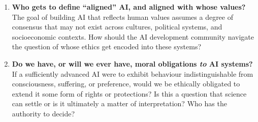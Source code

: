 \documentclass[a4paper,12pt]{article}
\begin{document}
\begin{enumerate}
\item \textbf{Who gets to define ``aligned'' AI, and aligned with
    whose values?} The goal of building AI that reflects human values
  assumes a degree of consensus that may not exist across cultures,
  political systems, and socioeconomic contexts. How should the AI
  development community navigate the question of whose ethics get
  encoded into these systems?

\item \textbf{Do we have, or will we ever have, moral obligations
    \textit{to} AI systems?} If a sufficiently advanced AI were to
  exhibit behaviour indistinguishable from consciousness, suffering,
  or preference, would we be ethically obligated to extend it some
  form of rights or protections? Is this a question that science can
  settle or is it ultimately a matter of interpretation? Who has the
  authority to decide?

\end{enumerate}
\end{document}
